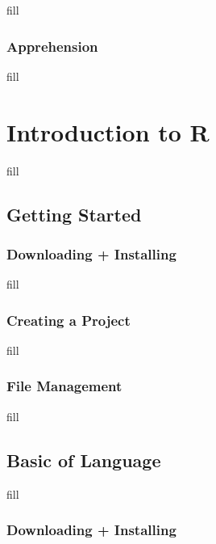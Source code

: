 \documentclass[
  b5paper]{book}
\begin{document}
fill

\hypertarget{apprehension}{%
\subsection*{Apprehension}\label{apprehension}}

fill

\hypertarget{introduction-to-r-1}{%
\chapter{Introduction to R}\label{introduction-to-r-1}}

fill

\hypertarget{getting-started}{%
\section{Getting Started}\label{getting-started}}

\hypertarget{downloading-installing}{%
\subsection*{Downloading + Installing}\label{downloading-installing}}

fill

\hypertarget{creating-a-project}{%
\subsection*{Creating a Project}\label{creating-a-project}}

fill

\hypertarget{file-management}{%
\subsection*{File Management}\label{file-management}}

fill

\hypertarget{basic-of-language}{%
\section{Basic of Language}\label{basic-of-language}}

fill

\hypertarget{downloading-installing-1}{%
\subsection*{Downloading + Installing}\label{downloading-installing-1}}
\end{document}
